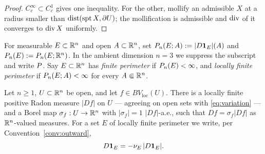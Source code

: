 \begin{proof}
$C^\infty_c\subset C^1_c$ gives one inequality.  For the other, mollify an
admissible $X$ at a radius smaller than $\operatorname{dist}(\operatorname{spt} X,\partial U)$; the
mollification is admissible and $\operatorname{div}$ of it converges to $\operatorname{div} X$ uniformly.
\end{proof}

\begin{definition}[Perimeter]\label{def:perimeter}
For measurable $E\subset\mathbb R^n$ and open $A\subset\mathbb R^n$, set
$P_n(E;A):=|D\mathbf 1_{E}|(A)$ and $P_n(E):=P_n(E;\mathbb R^n)$.
In the ambient dimension $n=3$ we suppress the subscript and write $P$.
Say $E\subset\mathbb R^n$ has \emph{finite perimeter} if
$P_n(E)<\infty$, and \emph{locally finite perimeter} if
$P_n(E;A)<\infty$ for every $A\Subset\mathbb R^n$.
\end{definition}

\begin{theorem}\label{thm:polar}
Let $n\ge1$, $U\subset\mathbb R^n$ be open, and let
$f\in BV_{\mathrm{loc}}(U)$.  There is a locally finite positive Radon
measure $|Df|$ on $U$ --- agreeing on open sets with \eqref{eq:variation} ---
and a Borel map $\sigma_f:U\to\mathbb R^n$ with $|\sigma_f|=1$ $|Df|$-a.e., such
that $Df=\sigma_f|Df|$ as $\mathbb R^n$-valued measures.  For a set $E$ of locally
finite perimeter we write, per Convention~\ref{conv:outward},
\begin{equation}\label{eq:polar-sign}
  D\mathbf 1_{E}=-\nu_E\,|D\mathbf 1_{E}| .
\end{equation}
\end{theorem}

